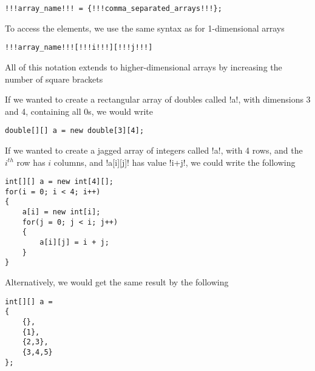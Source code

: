 \documentclass[11pt]{article}
\begin{document}
\begin{lstlisting}[style=javaSyntax]
!!!array_name!!! = {!!!comma_separated_arrays!!!}; 
\end{lstlisting}
\pagebreak
To access the elements, we use the same syntax as for 1-dimensional arrays
\vspace{-20pt}
\begin{lstlisting}[style=javaSyntax]
!!!array_name!!![!!!i!!!][!!!j!!!] 
\end{lstlisting}
All of this notation extends to higher-dimensional arrays by increasing the number of square brackets
\begin{egs} If we wanted to create a rectangular array of doubles called \inlineJava!a!, with dimensions 3 and 4, containing all 0s, we would write
\vspace{-15pt}
\begin{lstlisting}
double[][] a = new double[3][4];
\end{lstlisting}
If we wanted to create a jagged array of integers called \inlineJava!a!, with 4 rows, and the $i^{th}$ row has $i$ columns, and \inlineJava!a[i][j]! has value \inlineJava!i+j!, we could write the following
\vspace{-15pt}
\begin{lstlisting}
int[][] a = new int[4][];
for(i = 0; i < 4; i++)
{
    a[i] = new int[i];
    for(j = 0; j < i; j++)
    {
        a[i][j] = i + j;
    }
}
\end{lstlisting}
Alternatively, we would get the same result by the following
\vspace{-15pt}
\begin{lstlisting}
int[][] a = 
{
    {},
    {1},
    {2,3},
    {3,4,5}
};
\end{lstlisting}
\end{egs}

\printindex
\end{document}
